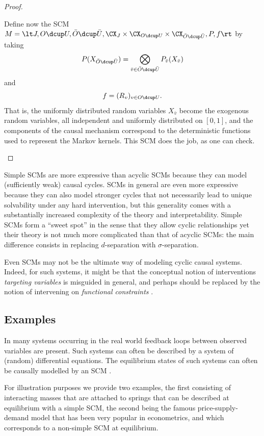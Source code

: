 \begin{proof}
\begin{enumerate}
      Define now the SCM $M = \lt J, O \dcup U, \bar O \dcup \bar U, \CX_J \times \CX_{O \dcup U} \times \CX_{\bar O \dcup \bar U}, P, f \rt$ by taking
      $$P(X_{\bar O \dcup \bar U}) = \bigotimes_{\bar v \in \bar O \dcup \bar U} P_{\bar v}(X_{\bar v})$$
      and
      $$f = (R_v)_{v \in O \dcup U}.$$
      That is, the uniformly distributed random variables $X_{\bar v}$ become the exogenous random variables,
      all independent and uniformly distributed on $[0,1]$, and the components of the causal mechanism correspond to the deterministic functions used to represent the Markov kernels.
      This SCM does the job, as one can check.
  \end{enumerate}
\end{proof}
Simple SCMs are more expressive than acyclic SCMs because they can model (sufficiently
weak) causal cycles. SCMs in general are even more expressive because they can also
model stronger cycles that not necessarily lead to unique solvability under any hard
intervention, but this generality comes with a substantially increased complexity of
the theory and interpretability. Simple SCMs form a ``sweet spot'' in the sense that they allow cyclic
relationships yet their theory is not much more complicated than that of acyclic SCMs:
the main difference consists in replacing $d$-separation with $\sigma$-separation.

Even SCMs may not be the ultimate way of modeling cyclic causal systems. Indeed, for such
systems, it might be that the conceptual notion of interventions \emph{targeting variables} is misguided in general, 
and perhaps should be replaced by the notion of intervening on \emph{functional constraints} \cite{BlomVanDiepenMooij_JMLR_21}.

\subsection{Examples}\label{sec:scm_examples}

In many systems occurring in the real world feedback loops between observed variables are present. 
Such systems can often be described by a system of (random) differential equations. 
The equilibrium states of such systems can often be causally modelled by an SCM \cite{BM18}.

For illustration purposes we provide two examples, the first consisting of interacting masses that are attached to springs
that can be described at equilibrium with a simple SCM, the second being the famous price-supply-demand model that has been
very popular in econometrics, and which corresponds to a non-simple SCM at equilibrium.

